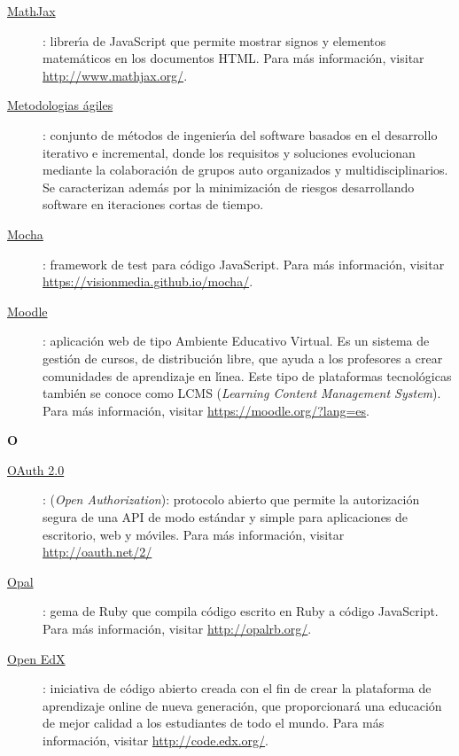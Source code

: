 \begin{description}
  \item[\underline{MathJax}\label{apend1:mathjax}]: librer\'{\i}a de JavaScript que permite mostrar signos y elementos matem\'aticos en los documentos HTML. Para m\'as informaci\'on, 
  visitar {\small \url{http://www.mathjax.org/}}.
  \bigskip

  \item[\underline{Metodologias \'agiles}\label{apend1:ma}]: conjunto de m\'etodos de ingenier\'{\i}a del software basados en el desarrollo iterativo e incremental, donde los requisitos y 
  soluciones evolucionan mediante la colaboraci\'on de grupos auto organizados y multidisciplinarios. Se caracterizan adem\'as por la minimizaci\'on de riesgos desarrollando software en
  iteraciones cortas de tiempo.
  \bigskip

  \item[\underline{Mocha}\label{apend1:mocha}]: framework de test para c\'odigo JavaScript. Para m\'as informaci\'on, visitar {\small \url{https://visionmedia.github.io/mocha/}}.
  \bigskip

  \item[\underline{Moodle}\label{apend1:moodle}]: aplicaci\'on web de tipo Ambiente Educativo Virtual. Es un sistema de gesti\'on de cursos, de distribuci\'on libre, que ayuda a los profesores a 
  crear comunidades de aprendizaje en l\'{\i}nea. Este tipo de plataformas tecnol\'ogicas tambi\'en se conoce como LCMS (\textit{Learning Content Management System}). Para m\'as informaci\'on, 
  visitar {\small \url{https://moodle.org/?lang=es}}.
  \bigskip
\end{description}

\bigskip
{\bfseries {\Huge O}}\label{Apendice1:O}
\bigskip
\bigskip

\begin{description}
  \item[\underline{OAuth 2.0}\label{apend1:oauth}]: (\textit{Open Authorization}): protocolo abierto que permite la autorizaci\'on segura de una API de modo est\'andar y simple para 
  aplicaciones de escritorio, web y m\'oviles. Para m\'as informaci\'on, visitar {\small \url{http://oauth.net/2/}}
  \bigskip

  \item[\underline{Opal}\label{apend1:opal}]: gema de Ruby que compila c\'odigo escrito en Ruby a c\'odigo JavaScript. Para m\'as informaci\'on, visitar {\small \url{http://opalrb.org/}}.
  \bigskip

  \item[\underline{Open EdX}\label{apend1:edx}]: iniciativa de c\'odigo abierto creada con el fin de crear la plataforma de aprendizaje online de nueva generaci\'on, que proporcionar\'a
  una educaci\'on de mejor calidad a los estudiantes de todo el mundo. Para m\'as informaci\'on, visitar {\small \url{http://code.edx.org/}}.
  \bigskip
\end{description}
\newpage

